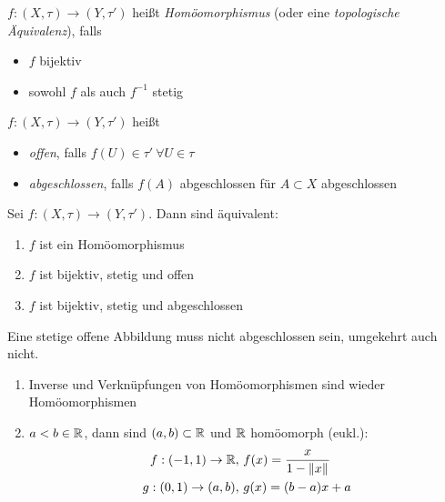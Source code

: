 \begin{dfn}
    $f:(X,\tau)\to(Y,\tau')$ heißt \emph{Homöomorphismus} (oder eine
    \emph{topologische Äquivalenz}), falls
    \begin{itemize}
        \item $f$ bijektiv
        \item sowohl $f$ als auch $f^{-1}$ stetig
    \end{itemize}
\end{dfn}

\begin{dfn}
    $f:(X,\tau)\to(Y,\tau')$ heißt
    \begin{itemize}
        \item \emph{offen}, falls $f(U)\in \tau'\ \forall U\in\tau$
        \item \emph{abgeschlossen}, falls $f(A)$ abgeschlossen für $A\subset X$
            abgeschlossen
    \end{itemize}
\end{dfn}

\begin{lem}
    Sei $f:(X,\tau)\to(Y,\tau')$. Dann sind äquivalent:
    \begin{enumerate}
        \item $f$ ist ein Homöomorphismus
        \item $f$ ist bijektiv, stetig und offen
        \item $f$ ist bijektiv, stetig und abgeschlossen
    \end{enumerate}
    \begin{bem}
        Eine stetige offene Abbildung muss nicht abgeschlossen sein, umgekehrt auch
        nicht.
    \end{bem}
    \begin{bsps}
        \begin{enumerate}
            \item Inverse und Verknüpfungen von Homöomorphismen sind wieder
                Homöomorphismen
            \item $a < b\in\mathbb{R}$, dann sind $(a,b)\subset\mathbb{R}$ und $\mathbb{R}$ homöomorph
                (eukl.):
                \begin{align}
                    f:(-1,1)\to\R,\ &f(x) = \frac{x}{1-\norm{x}} \\
                    g:(0,1)\to(a,b),\ &g(x) = (b-a)x + a
                \end{align}
        \end{enumerate}
    \end{bsps}
\end{lem}
